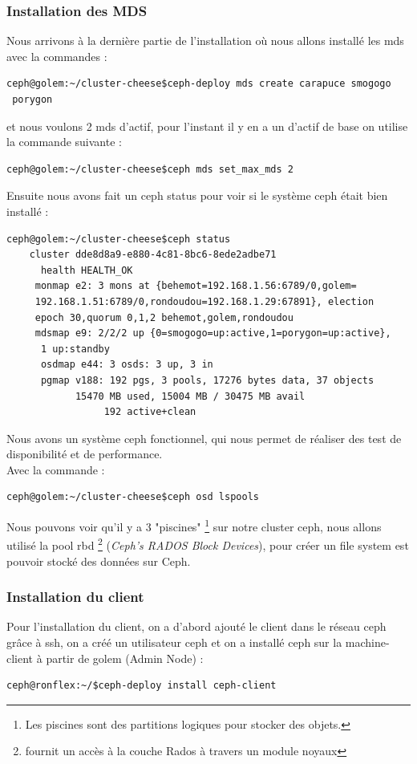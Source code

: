 \documentclass[12pt]{article}
\begin{document}
\subsubsection{Installation des MDS}

Nous arrivons à la dernière partie de l'installation où nous allons installé les mds avec la commandes :
\begin{verbatim}
ceph@golem:~/cluster-cheese$ceph-deploy mds create carapuce smogogo
 porygon
\end{verbatim}

et nous voulons 2 mds d'actif, pour l'instant il y en a un d'actif de base on utilise la commande suivante :
\begin{verbatim}
ceph@golem:~/cluster-cheese$ceph mds set_max_mds 2
\end{verbatim}

Ensuite nous avons fait un ceph status pour voir si le système ceph était bien installé :
\begin{verbatim}
ceph@golem:~/cluster-cheese$ceph status     
    cluster dde8d8a9-e880-4c81-8bc6-8ede2adbe71
      health HEALTH_OK  
     monmap e2: 3 mons at {behemot=192.168.1.56:6789/0,golem=
     192.168.1.51:6789/0,rondoudou=192.168.1.29:67891}, election 
     epoch 30,quorum 0,1,2 behemot,golem,rondoudou 
     mdsmap e9: 2/2/2 up {0=smogogo=up:active,1=porygon=up:active},
      1 up:standby
      osdmap e44: 3 osds: 3 up, 3 in 
      pgmap v188: 192 pgs, 3 pools, 17276 bytes data, 37 objects 
            15470 MB used, 15004 MB / 30475 MB avail 
                 192 active+clean 
\end{verbatim} 

Nous avons un système ceph fonctionnel, qui nous permet de réaliser des test de disponibilité et de performance.
\\Avec la commande :
\begin{verbatim}
ceph@golem:~/cluster-cheese$ceph osd lspools
\end{verbatim}

Nous pouvons voir qu'il y a 3 "piscines" \footnote{Les piscines sont des partitions logiques pour stocker des objets.} sur notre cluster ceph, nous allons utilisé la pool rbd \footnote{fournit un accès à la couche Rados à travers un module noyaux} (\textit{Ceph’s RADOS Block Devices}), pour créer un file system est pouvoir stocké des données sur Ceph.

\subsubsection{Installation du client}
Pour l'installation du client, on a d'abord ajouté le client dans le réseau ceph grâce à ssh, on a créé un utilisateur ceph et on a installé ceph sur la machine-client à partir de golem (Admin Node) :
\begin{verbatim}
ceph@ronflex:~/$ceph-deploy install ceph-client
\end{verbatim}
\end{document}

